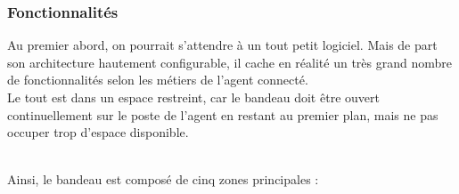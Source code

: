 \documentclass{rapport}
\begin{document}
\subsubsection{Fonctionnalités}

\begin{minipage}{0.65\textwidth}
Au premier abord, on pourrait s'attendre à un tout petit logiciel. Mais de part son architecture hautement configurable, il cache en réalité un très grand nombre de fonctionnalités selon les métiers de l'agent connecté.\\

Le tout est dans un espace restreint, car le bandeau doit être ouvert continuellement sur le poste de l'agent en restant au premier plan, mais ne pas occuper trop d'espace disponible.  
\end{minipage}
\begin{minipage}{0.25\textwidth}
\raggedright
\end{minipage}
\vspace{10mm} %
\noindent
\\

Ainsi, le bandeau est composé de cinq zones principales :
\end{document}
